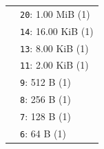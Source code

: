 \scriptsize
\setlength{\tabcolsep}{2pt}
\renewcommand{\arraystretch}{1.05}
\begin{tabular}{@{}l l@{}}
\definecolor{c0_255_255}{RGB}{0,255,255}
\colorbox{c0_255_255}{\phantom{Xg}} & \texttt{20}: 1.00 MiB (1) \\
\definecolor{c255_95_175}{RGB}{255,95,175}
\colorbox{c255_95_175}{\phantom{Xg}} & \texttt{14}: 16.00 KiB (1) \\
\definecolor{c135_0_255}{RGB}{135,0,255}
\colorbox{c135_0_255}{\phantom{Xg}} & \texttt{13}: 8.00 KiB (1) \\
\definecolor{c0_215_255}{RGB}{0,215,255}
\colorbox{c0_215_255}{\phantom{Xg}} & \texttt{11}: 2.00 KiB (1) \\
\definecolor{c255_175_0}{RGB}{255,175,0}
\colorbox{c255_175_0}{\phantom{Xg}} & \texttt{9}: 512 B (1) \\
\definecolor{c215_0_255}{RGB}{215,0,255}
\colorbox{c215_0_255}{\phantom{Xg}} & \texttt{8}: 256 B (1) \\
\definecolor{c255_0_255}{RGB}{255,0,255}
\colorbox{c255_0_255}{\phantom{Xg}} & \texttt{7}: 128 B (1) \\
\definecolor{c175_0_255}{RGB}{175,0,255}
\colorbox{c175_0_255}{\phantom{Xg}} & \texttt{6}: 64 B (1) \\
\end{tabular}
